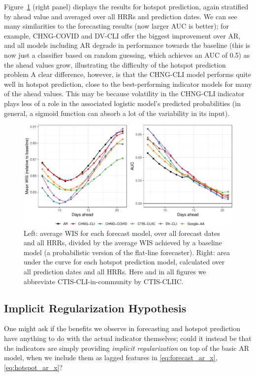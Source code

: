 \documentclass[9pt,twocolumn,twoside,lineno]{pnas-new}
\begin{document}
Figure~\ref{fig:forecast} (right panel) displays the results for hotspot
prediction, again stratified by ahead value and averaged over all HRRs and
prediction dates.  We can see many similarities to the forecasting results (now
larger AUC is better); for example, CHNG-COVID and DV-CLI offer the biggest
improvement over AR, and all models including AR degrade in performance towards
the baseline (this is now just a classifier based on random guessing, which
achieves an AUC of 0.5) as the ahead values grow, illustrating the difficulty of
the hotspot prediction problem A clear difference, however, is that the CHNG-CLI
model performs quite well in hotspot prediction, close to the best-performing
indicator models for many of the ahead values. This may be because volatility in
the CHNG-CLI indicator plays less of a role in the associated logistic model's
predicted probabilities (in general, a sigmoid function can absorb a lot of the
variability in its input).

\begin{figure}[t]
  \includegraphics[width=\textwidth]{fig/fcast-hot-combo-1.pdf}
  \caption{Left: average WIS for each forecast model, over all forecast dates
    and all HRRs, divided by the average WIS achieved by a baseline model (a
    probabilistic version of the flat-line forecaster).  Right: area under the
    curve for each hotspot prediction model, calculated over all prediction
    dates and all HRRs.  Here and in all figures we abbreviate
    CTIS-CLI-in-community by CTIS-CLIIC.  
  }  
  \label{fig:forecast}
\end{figure}


\subsection{Implicit Regularization Hypothesis}

One might ask if the benefits we observe in forecasting and hotspot
prediction have anything to do with the actual indicator themselves; could it
instead be that the indicators are simply providing \textit{implicit
  regularization} on top of  the basic AR model, when we include them as lagged
features in \eqref{eq:forecast_ar_x}, \eqref{eq:hotspot_ar_x}?   
\end{document}
